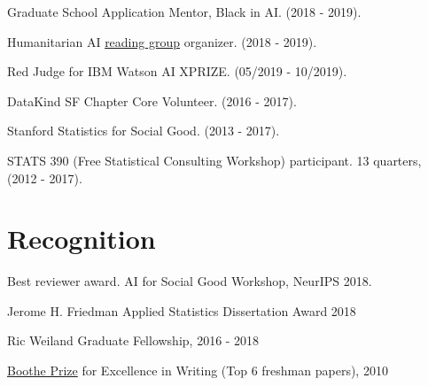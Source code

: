 \documentclass[letterpaper]{article}
\renewenvironment{itemize}{
  \begin{list}{}{
    \setlength{\leftmargin}{1.5em}
  }
}{
  \end{list}
}
\begin{document}
\begin{itemize}
\item Graduate School Application Mentor, Black in AI. (2018 - 2019).
\item Humanitarian AI \href{https://krisrs1128.github.io/Humanitarian-AI/}{reading group} organizer. (2018 - 2019).
\item Red Judge for IBM Watson AI XPRIZE. (05/2019 - 10/2019).
\item DataKind SF Chapter Core Volunteer. (2016 - 2017).
\item Stanford Statistics for Social Good. (2013 - 2017).
\item STATS 390 (Free Statistical Consulting Workshop) participant. 13 quarters, (2012 - 2017).
\end{itemize}

\section*{Recognition}
\begin{itemize}
\item Best reviewer award. AI for Social Good Workshop, NeurIPS 2018.
\item Jerome H. Friedman Applied Statistics Dissertation Award 2018
\item Ric Weiland Graduate Fellowship, 2016 - 2018
\item \href{https://undergrad.stanford.edu/programs/pwr/publications-prizes-and-awards/boothe-prize-essays}{Boothe Prize} for Excellence in Writing (Top 6 freshman papers), 2010
\end{itemize}
\end{document}
